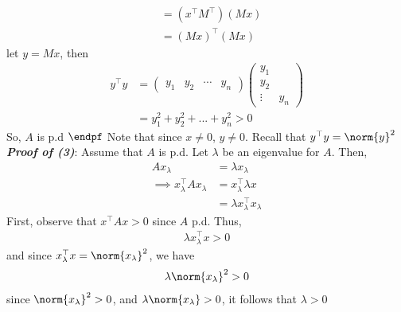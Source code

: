\documentclass{report}
\begin{document}
\begin{itemize}
\begin{align*}
               &=(x^{\top}M^{\top})(Mx) \\
               &=(Mx)^{\top}(Mx)
            \end{align*}
            let $y = Mx $, then
            \begin{align*}
                y^{\top}y &= \begin{pmatrix} y_{1} & y_{2} & \cdots&y_{n} \end{pmatrix} \begin{pmatrix} y_{1} \\ y_{2} \\ \vdots & y_{n} \end{pmatrix} \\
                          &=y_{1}^{2} + y_{2}^{2} + ... + y_{n}^{2} > 0
            \end{align*}
            So, $A$ is p.d $\endpf$
            \bigbreak \noindent 
            Note that since $x \ne 0$, $y\ne 0$. 
            \bigbreak \noindent 
            Recall that $y^{\top}y = \norm{y}^{2}$
            \bigbreak \noindent 
            \textbf{\textit{Proof of (3)}}: Assume that $A$ is p.d. Let $\lambda$ be an eigenvalue for $A$. Then,
            \begin{align*}
                Ax_{\lambda} &= \lambda x_{\lambda} \\
                \implies x^{\top}_{\lambda}Ax_{\lambda} &= x^{\top}_{\lambda}\lambda x \\
                                                        &= \lambda x^{\top}_{\lambda} x_{\lambda}
            \end{align*}
            First, observe that $x^{\top}Ax >0$ since $A$ p.d. Thus,
            \begin{align*}
               \lambda x_{\lambda}^{\top} x > 0 
            \end{align*}
            and since $x_{\lambda}^{\top} x = \norm{x_{\lambda}}^{2} $, we have
            \begin{align*}
                \lambda \norm{x_{\lambda}}^{2} > 0 
            \end{align*}
            since $ \norm{x_{\lambda}}^{2} > 0$, and $ \lambda \norm{x_{\lambda}} > 0 $, it follows that $\lambda > 0$


\end{itemize}
\end{document}
